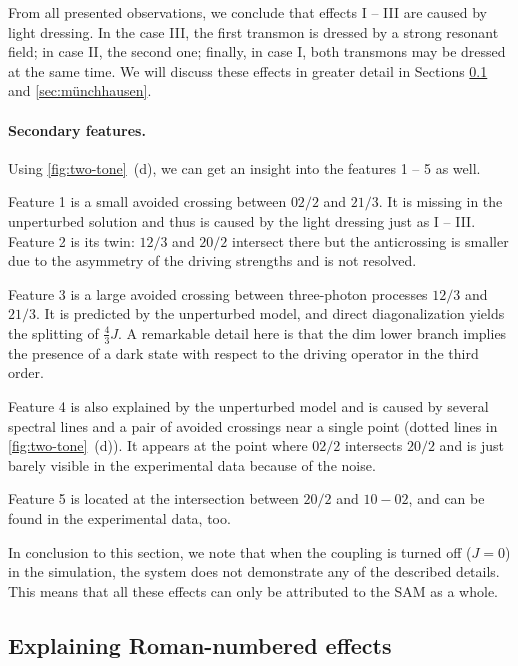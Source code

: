 \documentclass[%
 aps, prx,
 amsmath,amssymb,
 reprint,%
superscriptaddress
]{revtex4-2}
\begin{document}
From all presented observations, we conclude that effects I -- III 
are caused by light dressing. In the case III, the 
first transmon is dressed by a strong resonant 
field; in case II, the second one; finally, in 
case I, both transmons may be dressed at the same 
time. We will discuss these effects in greater 
detail in Sections \ref{sec:theory} and \ref{sec:münchhausen}.

\paragraph{Secondary features.} Using 
\autoref{fig:two-tone}~(d), we can get an insight 
into the features 1 -- 5 as well. 

Feature 1 is a small avoided crossing between 
${02/2}$ and ${21/3}$. It is missing in the 
unperturbed solution and thus is caused by the 
light dressing just as I -- III. Feature 2 is its 
twin: ${12/3}$ and ${20/2}$ intersect there but 
the anticrossing is smaller due to the asymmetry 
of the driving strengths and is not resolved. 

Feature 3 is a large avoided crossing between 
three-photon processes ${12/3}$ and ${21/3}$. It 
is predicted by the unperturbed model, and direct 
diagonalization yields the splitting of 
$\frac{4}{3}J$. A remarkable detail here is that 
the dim lower branch implies the presence of a 
dark state with respect to the driving operator 
in the third order. 

Feature 4 is also explained by the unperturbed 
model and is caused by several spectral lines and 
a pair of avoided crossings near a single point 
(dotted lines in \autoref{fig:two-tone}~(d)). It 
appears at the point where ${02/2}$ intersects 
${20/2}$ and is just barely visible in the 
experimental data because of the noise. 

Feature 5 is located at the intersection between ${20/2}$ 
and ${10} - {02}$, and can be 
found in the experimental data, too. 

In conclusion to this section, we note that when the coupling is turned off ($J=0$) in the simulation, the system does not demonstrate any of the described details. This means that all these effects can only be attributed to the SAM as a whole. 

\subsection{Explaining Roman-numbered effects}\label{sec:theory}
\end{document}
